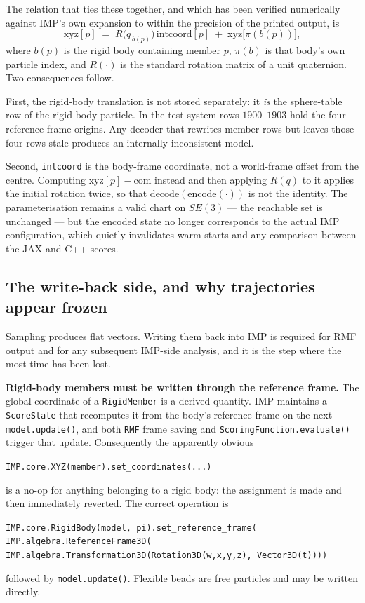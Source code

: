 \documentclass[11pt]{article}
\newcommand{\code}[1]{\texttt{#1}}
\begin{document}
The relation that ties these together, and which has been verified numerically
against IMP's own expansion to within the precision of the printed output, is
\begin{equation}
  \label{eq:expand}
  \mathrm{xyz}[p] \;=\; R\bigl(q_{\,b(p)}\bigr)\,\mathrm{intcoord}[p]
                    \;+\; \mathrm{xyz}\bigl[\pi(b(p))\bigr],
\end{equation}
where $b(p)$ is the rigid body containing member $p$, $\pi(b)$ is that body's
own particle index, and $R(\cdot)$ is the standard rotation matrix of a unit
quaternion. Two consequences follow.

First, the rigid-body translation is not stored separately: it \emph{is} the
sphere-table row of the rigid-body particle. In the test system rows
$1900$--$1903$ hold the four reference-frame origins. Any decoder that rewrites
member rows but leaves those four rows stale produces an internally
inconsistent model.

Second, \code{intcoord} is the body-frame coordinate, not a world-frame offset
from the centre. Computing $\mathrm{xyz}[p] - \mathrm{com}$ instead and then
applying $R(q)$ to it applies the initial rotation twice, so that
$\mathrm{decode}(\mathrm{encode}(\cdot))$ is not the identity. The
parameterisation remains a valid chart on $SE(3)$ --- the reachable set is
unchanged --- but the encoded state no longer corresponds to the actual IMP
configuration, which quietly invalidates warm starts and any comparison between
the JAX and C++ scores.

\subsection{The write-back side, and why trajectories appear frozen}

Sampling produces flat vectors. Writing them back into IMP is required for RMF
output and for any subsequent IMP-side analysis, and it is the step where the
most time has been lost.

\textbf{Rigid-body members must be written through the reference frame.} The
global coordinate of a \code{RigidMember} is a derived quantity. IMP maintains a
\code{ScoreState} that recomputes it from the body's reference frame on the next
\code{model.update()}, and both \code{RMF} frame saving and
\code{ScoringFunction.evaluate()} trigger that update. Consequently the
apparently obvious
\begin{center}
\code{IMP.core.XYZ(member).set\_coordinates(...)}
\end{center}
is a no-op for anything belonging to a rigid body: the assignment is made and
then immediately reverted. The correct operation is
\begin{center}
\code{IMP.core.RigidBody(model, pi).set\_reference\_frame(} \\
\code{IMP.algebra.ReferenceFrame3D(} \\
\code{IMP.algebra.Transformation3D(Rotation3D(w,x,y,z), Vector3D(t))))}
\end{center}
followed by \code{model.update()}. Flexible beads are free particles and may be
written directly.
\end{document}
